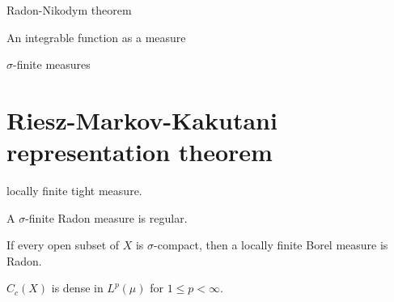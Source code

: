 \documentclass{../../large}
\begin{document}
Radon-Nikodym theorem

An integrable function as a measure

$\sigma$-finite measures

\section{Riesz-Markov-Kakutani representation theorem}




locally finite tight measure.


\begin{prb}
\begin{parts}
\item A $\sigma$-finite Radon measure is regular.
\item If every open subset of $X$ is $\sigma$-compact, then a locally finite Borel measure is Radon.
\item $C_c(X)$ is dense in $L^p(\mu)$ for $1\le p<\infty$.
\end{parts}
\end{prb}
\end{document}
